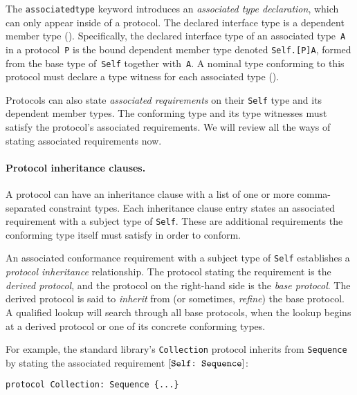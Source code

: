 \documentclass[../generics]{subfiles}
\begin{document}
The \texttt{associatedtype} keyword introduces an \emph{associated type declaration}, which can only appear inside of a protocol. The declared interface type is a dependent member type (). Specifically, the declared interface type of an associated type~\texttt{A} in a protocol~\texttt{P} is the bound dependent member type denoted \texttt{Self.[P]A}, formed from the base type of~\texttt{Self} together with~\texttt{A}. A nominal type conforming to this protocol must declare a type witness for each associated type (). 

Protocols can also state \emph{associated requirements} on their \texttt{Self} type and its dependent member types. The conforming type and its type witnesses must satisfy the protocol's associated requirements. We will review all the ways of stating associated requirements now.

\paragraph{Protocol inheritance clauses.}
A protocol can have an inheritance clause with a list of one or more comma-separated constraint types. Each inheritance clause entry states an associated requirement with a subject type of \texttt{Self}. These are additional requirements the conforming type itself must satisfy in order to conform.

An associated conformance requirement with a subject type of \texttt{Self} establishes a \emph{protocol inheritance} relationship. The protocol stating the requirement is the \emph{derived protocol}, and the protocol on the right-hand side is the \emph{base protocol}. The derived protocol is said to \emph{inherit} from (or sometimes, \emph{refine}) the base protocol. A qualified lookup will search through all base protocols, when the lookup begins at a derived protocol or one of its concrete conforming types.

For example, the standard library's \texttt{Collection} protocol inherits from \texttt{Sequence} by stating the associated requirement $[\texttt{Self:~Sequence}]$:
\begin{Verbatim}
protocol Collection: Sequence {...}
\end{Verbatim}
\end{document}
